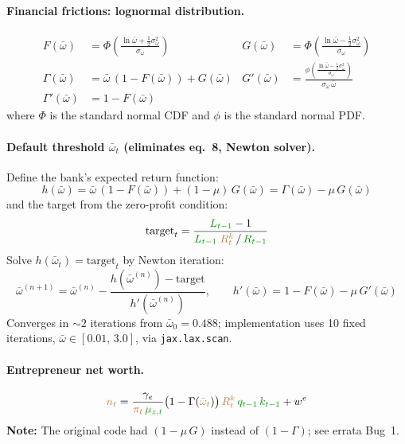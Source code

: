 \documentclass[11pt]{article}
\begin{document}
\paragraph{Financial frictions: lognormal distribution.}
\begin{align*}
  F(\bar\omega) &= \Phi\!\left(\frac{\ln\bar\omega + \tfrac{1}{2}\sigma_\omega^2}{\sigma_\omega}\right)
  &
  G(\bar\omega) &= \Phi\!\left(\frac{\ln\bar\omega - \tfrac{1}{2}\sigma_\omega^2}{\sigma_\omega}\right)
  \\
  \Gamma(\bar\omega) &= \bar\omega\,(1-F(\bar\omega)) + G(\bar\omega)
  &
  G'(\bar\omega) &= \frac{\phi\!\left(\frac{\ln\bar\omega - \tfrac{1}{2}\sigma_\omega^2}{\sigma_\omega}\right)}
    {\sigma_\omega\,\bar\omega}
  \\
  \Gamma'(\bar\omega) &= 1 - F(\bar\omega)
\end{align*}
where $\Phi$ is the standard normal CDF and $\phi$ is the standard normal PDF.

\paragraph{Default threshold $\bar\omega_t$ (eliminates eq.~8, Newton solver).}
Define the bank's expected return function:
\begin{equation*}
  h(\bar\omega) = \bar\omega\,(1-F(\bar\omega)) + (1-\mu)\,G(\bar\omega)
  = \Gamma(\bar\omega) - \mu\,G(\bar\omega)
\end{equation*}
and the target from the zero-profit condition:
\begin{equation*}
  \text{target}_t = \frac{\textcolor{green!60!black}{L_{t-1}} - 1}
    {\textcolor{green!60!black}{L_{t-1}}\;\textcolor{brown}{R_t^k}\,/\,\textcolor{green!60!black}{R_{t-1}}}
\end{equation*}
Solve $h(\bar\omega_t) = \text{target}_t$ by Newton iteration:
\begin{equation*}
  \boxed{\bar\omega^{(n+1)} = \bar\omega^{(n)}
    - \frac{h(\bar\omega^{(n)}) - \text{target}}{h'(\bar\omega^{(n)})},
  \qquad
  h'(\bar\omega) = 1-F(\bar\omega) - \mu\,G'(\bar\omega)}
\end{equation*}
Converges in ${\sim}2$ iterations from $\bar\omega_0 = 0.488$;
implementation uses 10 fixed iterations, $\bar\omega \in [0.01,\,3.0]$, via
\texttt{jax.lax.scan}.

\paragraph{Entrepreneur net worth.}
\begin{equation*}
  \textcolor{brown}{n_t} = \frac{\gamma_e}{\textcolor{orange!80!black}{\pi_t}\,\textcolor{green!60!black}{\mu_{z,t}}}
    \bigl(1 - \Gamma(\textcolor{brown}{\bar\omega_t})\bigr)\,
    \textcolor{brown}{R_t^k}\,\textcolor{green!60!black}{q_{t-1}}\,\textcolor{green!60!black}{k_{t-1}}
    + w^e
\end{equation*}
\textbf{Note:} The original code had $(1 - \mu\,G)$ instead of $(1-\Gamma)$;
see errata Bug~1.
\end{document}
